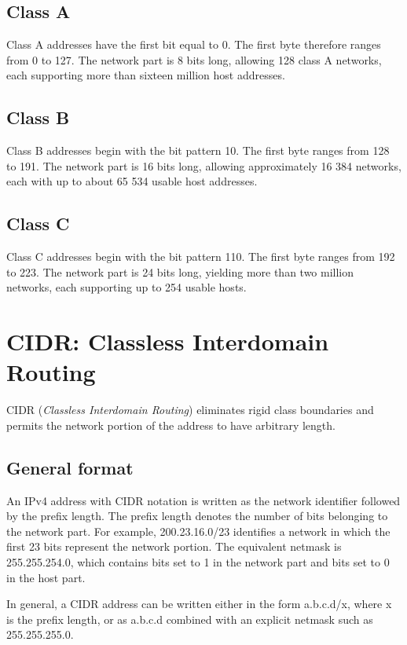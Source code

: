 \subsection{Class A}

Class A addresses have the first bit equal to 0. The first byte therefore ranges from 0 to 127. The network part is 8 bits long, allowing 128 class A networks, each supporting more than sixteen million host addresses.

\subsection{Class B}

Class B addresses begin with the bit pattern 10. The first byte ranges from 128 to 191. The network part is 16 bits long, allowing approximately 16 384 networks, each with up to about 65 534 usable host addresses.

\subsection{Class C}

Class C addresses begin with the bit pattern 110. The first byte ranges from 192 to 223. The network part is 24 bits long, yielding more than two million networks, each supporting up to 254 usable hosts.

\section{CIDR: Classless Interdomain Routing}

CIDR (\emph{Classless Interdomain Routing}) eliminates rigid class boundaries and permits the network portion of the address to have arbitrary length.

\subsection{General format}

An IPv4 address with CIDR notation is written as the network identifier followed by the prefix length. The prefix length denotes the number of bits belonging to the network part. For example, 200.23.16.0/23 identifies a network in which the first 23 bits represent the network portion. The equivalent netmask is 255.255.254.0, which contains bits set to 1 in the network part and bits set to 0 in the host part.

In general, a CIDR address can be written either in the form a.b.c.d/x, where x is the prefix length, or as a.b.c.d combined with an explicit netmask such as 255.255.255.0.

